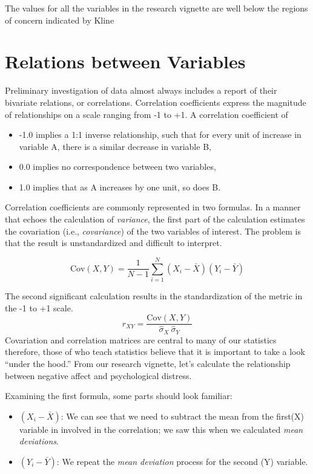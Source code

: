 \documentclass[
  11pt,
]{book}
\providecommand{\tightlist}{%
  \setlength{\itemsep}{0pt}\setlength{\parskip}{0pt}}
\begin{document}
The values for all the variables in the research vignette are well below the regions of concern indicated by Kline \citeyearpar{kline_principles_2016}

\hypertarget{relations-between-variables}{%
\section{Relations between Variables}\label{relations-between-variables}}

Preliminary investigation of data almost always includes a report of their bivariate relations, or correlations. Correlation coefficients express the magnitude of relationships on a scale ranging from -1 to +1. A correlation coefficient of

\begin{itemize}
\tightlist
\item
  -1.0 implies a 1:1 inverse relationship, such that for every unit of increase in variable A, there is a similar decrease in variable B,
\item
  0.0 implies no correspondence between two variables,
\item
  1.0 implies that as A increases by one unit, so does B.
\end{itemize}

Correlation coefficients are commonly represented in two formulas. In a manner that echoes the calculation of \emph{variance}, the first part of the calculation estimates the covariation (i.e., \emph{covariance}) of the two variables of interest. The problem is that the result is unstandardized and difficult to interpret.

\[
\mbox{Cov}(X,Y) = \frac{1}{N-1} \sum_{i=1}^N \left( X_i - \bar{X} \right) \left( Y_i - \bar{Y} \right)
\]

The second significant calculation results in the standardization of the metric in the -1 to +1 scale.
\[
r_{XY}  = \frac{\mbox{Cov}(X,Y)}{ \hat{\sigma}_X \ \hat{\sigma}_Y}
\]
Covariation and correlation matrices are central to many of our statistics therefore, those of who teach statistics believe that it is important to take a look ``under the hood.'' From our research vignette, let's calculate the relationship between negative affect and psychological distress.

Examining the first formula, some parts should look familiar:

\begin{itemize}
\tightlist
\item
  \((X_i - \bar{X})\): We can see that we need to subtract the mean from the first(X) variable in involved in the correlation; we saw this when we calculated \emph{mean deviations}.
\item
  \((Y_i - \bar{Y})\): We repeat the \emph{mean deviation} process for the second (Y) variable.
\end{itemize}
\end{document}
